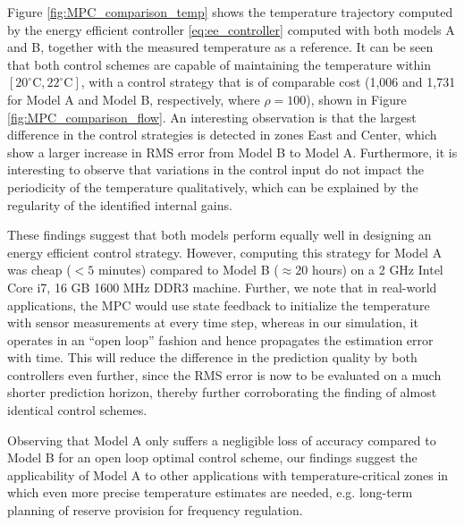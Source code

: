 Figure \ref{fig:MPC_comparison_temp} shows the temperature trajectory computed by the energy efficient controller \eqref{eq:ee_controller} computed with both models A and B, together with the measured temperature as a reference. 
It can be seen that both control schemes are capable of maintaining the temperature within $[20^\circ \text{C}, 22^\circ \text{C}]$, with a control strategy that is of comparable cost (1,006 and 1,731 for Model A and Model B, respectively, where $\rho=100$), shown in Figure \ref{fig:MPC_comparison_flow}. An interesting observation is that the largest difference in the control strategies is detected in zones East and Center, which show a larger increase in RMS error from Model B to Model A.
Furthermore, it is interesting to observe that variations in the control input do not impact the periodicity of the temperature qualitatively, which can be explained by the regularity of the identified internal gains.

These findings suggest that both models perform equally well in designing an energy efficient control strategy. However, computing this strategy for Model A was cheap ($<5$ minutes) compared to Model B ($\approx 20$ hours) on a 2 GHz Intel Core i7, 16 GB 1600 MHz DDR3 machine. Further, we note that in real-world applications, the MPC would use state feedback to initialize the temperature with sensor measurements at every time step, whereas in our simulation, it operates in an ``open loop'' fashion and hence propagates the estimation error with time. This will reduce the difference in the prediction quality by both controllers even further, since the RMS error is now to be evaluated on a much shorter prediction horizon, thereby further corroborating the finding of almost identical control schemes.

Observing that Model A only suffers a negligible loss of accuracy compared to Model B for an open loop optimal control scheme, our findings suggest the applicability of Model A to other applications with temperature-critical zones in which even more precise temperature estimates are needed, e.g. long-term planning of reserve provision for frequency regulation.




